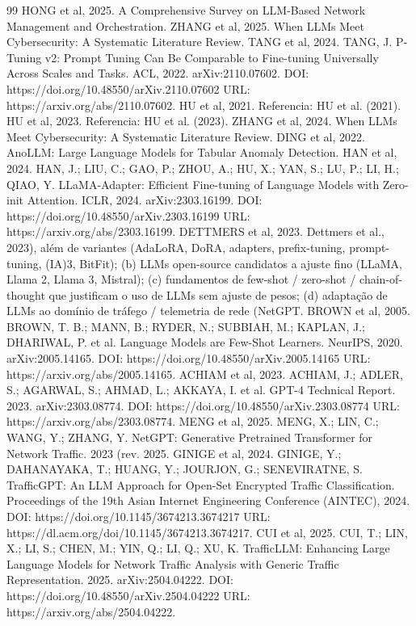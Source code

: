 \documentclass[12pt,a4paper]{article}
\begin{document}
\begin{thebibliography}{99}
 HONG et al, 2025. A Comprehensive Survey on LLM-Based Network Management and Orchestration.
 ZHANG et al, 2025. When LLMs Meet Cybersecurity: A Systematic Literature Review.
 TANG et al, 2024. TANG, J. P-Tuning v2: Prompt Tuning Can Be Comparable to Fine-tuning Universally Across Scales and Tasks. ACL, 2022. arXiv:2110.07602. DOI: https://doi.org/10.48550/arXiv.2110.07602 URL: https://arxiv.org/abs/2110.07602.
 HU et al, 2021. Referencia: HU et al. (2021).
 HU et al, 2023. Referencia: HU et al. (2023).
 ZHANG et al, 2024. When LLMs Meet Cybersecurity: A Systematic Literature Review.
 DING et al, 2022. AnoLLM: Large Language Models for Tabular Anomaly Detection.
 HAN et al, 2024. HAN, J.; LIU, C.; GAO, P.; ZHOU, A.; HU, X.; YAN, S.; LU, P.; LI, H.; QIAO, Y. LLaMA-Adapter: Efficient Fine-tuning of Language Models with Zero-init Attention. ICLR, 2024. arXiv:2303.16199. DOI: https://doi.org/10.48550/arXiv.2303.16199 URL: https://arxiv.org/abs/2303.16199.
 DETTMERS et al, 2023. Dettmers et al., 2023), além de variantes (AdaLoRA, DoRA, adapters, prefix-tuning, prompt-tuning, (IA)3, BitFit); (b) LLMs open-source candidatos a ajuste fino (LLaMA, Llama 2, Llama 3, Mistral); (c) fundamentos de few-shot / zero-shot / chain-of-thought que justificam o uso de LLMs sem ajuste de pesos; (d) adaptação de LLMs ao domínio de tráfego / telemetria de rede (NetGPT.
 BROWN et al, 2005. BROWN, T. B.; MANN, B.; RYDER, N.; SUBBIAH, M.; KAPLAN, J.; DHARIWAL, P. et al. Language Models are Few-Shot Learners. NeurIPS, 2020. arXiv:2005.14165. DOI: https://doi.org/10.48550/arXiv.2005.14165 URL: https://arxiv.org/abs/2005.14165.
 ACHIAM et al, 2023. ACHIAM, J.; ADLER, S.; AGARWAL, S.; AHMAD, L.; AKKAYA, I. et al. GPT-4 Technical Report. 2023. arXiv:2303.08774. DOI: https://doi.org/10.48550/arXiv.2303.08774 URL: https://arxiv.org/abs/2303.08774.
 MENG et al, 2025. MENG, X.; LIN, C.; WANG, Y.; ZHANG, Y. NetGPT: Generative Pretrained Transformer for Network Traffic. 2023 (rev. 2025.
 GINIGE et al, 2024. GINIGE, Y.; DAHANAYAKA, T.; HUANG, Y.; JOURJON, G.; SENEVIRATNE, S. TrafficGPT: An LLM Approach for Open-Set Encrypted Traffic Classification. Proceedings of the 19th Asian Internet Engineering Conference (AINTEC), 2024. DOI: https://doi.org/10.1145/3674213.3674217 URL: https://dl.acm.org/doi/10.1145/3674213.3674217.
 CUI et al, 2025. CUI, T.; LIN, X.; LI, S.; CHEN, M.; YIN, Q.; LI, Q.; XU, K. TrafficLLM: Enhancing Large Language Models for Network Traffic Analysis with Generic Traffic Representation. 2025. arXiv:2504.04222. DOI: https://doi.org/10.48550/arXiv.2504.04222 URL: https://arxiv.org/abs/2504.04222.

\end{thebibliography}
\end{document}
